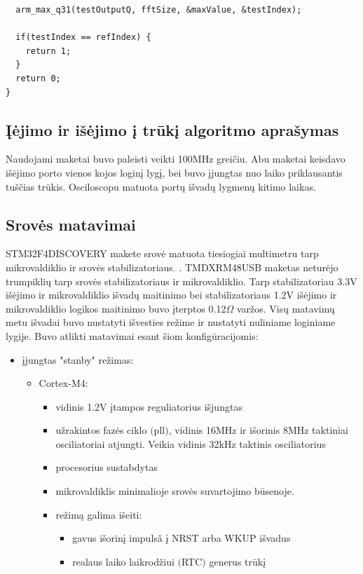 \documentclass[a4paper, 12pt]{article} %
\begin{document}
\begin{onehalfspacing}
\begin{verbatim}
  arm_max_q31(testOutputQ, fftSize, &maxValue, &testIndex); 

  if(testIndex == refIndex) { 
    return 1;
  } 
  return 0;
}
\end{verbatim}
\subsection{\k{I}\.ejimo ir i\v{s}\.ejimo \k{i} tr\=uk\k{i} algoritmo apra\v{s}ymas}
Naudojami maketai buvo paleisti veikti 100MHz grei\v{c}iu. Abu maketai keisdavo i\v{s}\.ejimo porto vienos kojos login\k{i} lyg\k{i}, bei buvo \k{i}jungtas nuo laiko priklausantis tu\v{s}\v{c}ias tr\=ukis. Osciloscopu matuota port\k{u} i\v{s}vad\k{u} lygmen\k{u} kitimo laikas.
\subsection{Srov\.es matavimai}
STM32F4DISCOVERY makete srov\.e matuota tiesiogiai multimetru 
tarp mikrovaldiklio ir srov\.es stabilizatoriaus. . TMDXRM48USB maketas netur\.ejo 
trumpikli\k{u} tarp srov\.es stabilizatoriaus ir mikrovaldiklio. Tarp stabilizatoriau 3.3V i\v{s}\.ejimo ir mikrovaldiklio i\v{s}vad\k{u} maitinimo bei stabilizatoriaus 1.2V i\v{s}\.ejimo ir mikrovaldiklio logikos maitinimo buvo \k{i}terptos 0.12$\Omega$ var\v{z}os. Vis\k{u} matavim\k{u} metu 
  i\v{s}vadai buvo nustatyti i\v{s}vesties re\v{z}ime ir 
  nustatyti nuliniame loginiame lygije. Buvo atlikti matavimai
  esant \v{s}iom konfig\={u}racijomis:
\begin{itemize}
\item \k{i}jungtas "stanby" re\v{z}imas:
\begin{itemize} 
\item Cortex-M4:
\begin{itemize}
\item vidinis 1.2V \k{i}tampos reguliatorius i\v{s}jungtas
\item u\v{z}rakintos faz\.es ciklo $($pll$)$, vidinis 16MHz ir i\v{s}orinis 8MHz taktiniai osciliatoriai atjungti. Veikia vidinis 32kHz taktinis osciliatorius
\item procesorius sustabdytas
\item mikrovaldiklis minimalioje srov\.es suvartojimo b\=usenoje.
\item re\v{z}im\k{a} galima i\v{s}eiti:
\begin{itemize} 
\item gavus i\v{s}orin\k{i} impuls\v{a} \k{i} NRST arba WKUP i\v{s}vadus 
\item realaus laiko laikrod\v{z}iui $($RTC$)$ generus tr\=uk\k{i}

\end{itemize}
\end{itemize}
\end{itemize}
\end{itemize}
\end{onehalfspacing}
\end{document}
